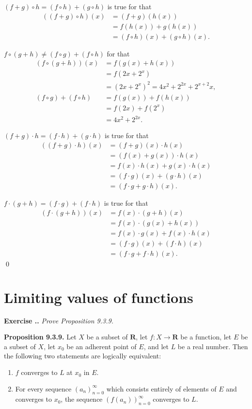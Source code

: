\documentclass{book}
\newcommand{\titl}[1]{\noindent\textbf{#1}}
\newcounter{Exercise}[section]
\renewcommand{\theExercise}{\thesection.\arabic{Exercise}.}
\newcommand{\new}{\vspace{1.5em}\noindent\textbf{{Exercise \stepcounter{Exercise}\textbf{\theExercise}}} }
\begin{document}
$(f+g)\circ h=(f\circ h)+(g\circ h)$ is true for that
    \begin{align*}
        ((f+g)\circ h)(x)
        &=(f+g)(h(x))\\
        &=f(h(x))+g(h(x))\\
        &=(f\circ h)(x)+(g\circ h)(x).
    \end{align*}

$f\circ(g+h)\neq(f\circ g)+(f\circ h)$ for that
    \begin{align*}
        (f\circ(g+h))(x)
        &=f(g(x)+h(x))\\
        &=f(2x+2^x)\\
        &=(2x+2^x)^2=4x^2+2^{2x}+2^{x+2}x,\\
        (f\circ g)+(f\circ h)&=f(g(x))+f(h(x))\\
        &=f(2x)+f(2^x)\\
        &=4x^2+2^{2x}.
    \end{align*}

$(f+g)\cdot h=(f\cdot h)+(g\cdot h)$ is true for that
    \begin{align*}
        ((f+g)\cdot h)(x)
        &=(f+g)(x)\cdot h(x)\\
        &=(f(x)+g(x))\cdot h(x)\\
        &=f(x)\cdot h(x)+g(x)\cdot h(x)\\
        &=(f\cdot g)(x)+(g\cdot h)(x)\\
        &=(f\cdot g+g\cdot h)(x).
    \end{align*}

$f\cdot(g+h)=(f\cdot g)+(f\cdot h)$ is true for that
    \begin{align*}
        (f\cdot(g+h))(x)
        &=f(x)\cdot(g+h)(x)\\
        &=f(x)\cdot(g(x)+h(x))\\
        &=f(x)\cdot g(x)+f(x)\cdot h(x)\\
        &=(f\cdot g)(x)+(f\cdot h)(x)\\
        &=(f\cdot g+f\cdot h)(x).
    \end{align*}\qed

\section{Limiting values of functions}

\new\emph{Prove Proposition 9.3.9.}

\begin{framed}
\titl{Proposition 9.3.9.} Let $X$ be a subset of $\mathbf{R}$, let $f:X\to\mathbf{R}$ be a function, let $E$ be a subset of $X$, let $x_0$ be an adherent point of $E$, and let $L$ be a real number. Then the following two statements are logically equivalent:
\begin{enumerate}
    \item $f$ converges to $L$ at $x_0$ in $E$.
    \item For every sequence $(a_n)_{n=0}^{\infty}$ which consists entirely of elements of $E$ and converges to $x_0$, the sequence $(f(a_n))_{n=0}^{\infty}$ converges to $L$.
\end{enumerate}
\end{framed}
\end{document}
